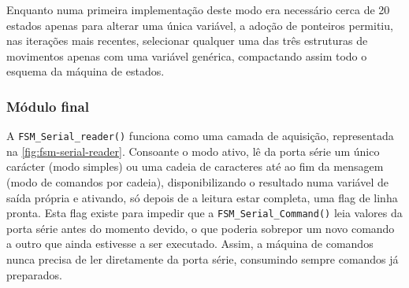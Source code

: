 Enquanto numa primeira implementação deste modo era necessário cerca de 20 estados apenas para alterar uma única variável, a adoção de ponteiros permitiu, nas iterações mais recentes, selecionar qualquer uma das três estruturas de movimentos apenas com uma variável genérica, compactando assim todo o esquema da máquina de estados.

\subsubsection{Módulo final}
A \texttt{FSM\_Serial\_reader()} funciona como uma camada de aquisição, representada na \cref{fig:fsm-serial-reader}. Consoante o modo ativo, lê da porta série um único carácter (modo simples) ou uma cadeia de caracteres até ao fim da mensagem (modo de comandos por cadeia), disponibilizando o resultado numa variável de saída própria e ativando, só depois de a leitura estar completa, uma flag de linha pronta. Esta flag existe para impedir que a \texttt{FSM\_Serial\_Command()} leia valores da porta série antes do momento devido, o que poderia sobrepor um novo comando a outro que ainda estivesse a ser executado. Assim, a máquina de comandos nunca precisa de ler diretamente da porta série, consumindo sempre comandos já preparados.

